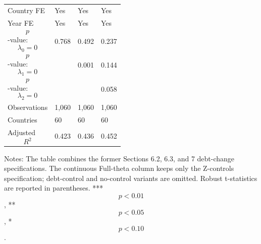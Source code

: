 \begin{table}[H]
\begin{threeparttable}
\begin{tabularx}{\textwidth}{lYYY}
Country FE & Yes & Yes & Yes \\
Year FE & Yes & Yes & Yes \\
$$p$$-value: $$\lambda_0=0$$ & 0.768 & 0.492 & 0.237 \\
$$p$$-value: $$\lambda_1=0$$ &  & 0.001 & 0.144 \\
$$p$$-value: $$\lambda_2=0$$ &  &  & 0.058 \\
Observations & 1,060 & 1,060 & 1,060 \\
Countries & 60 & 60 & 60 \\
Adjusted $$R^2$$ & 0.423 & 0.436 & 0.452 \\
\bottomrule
\end{tabularx}
\begin{tablenotes}[flushleft]\footnotesize
\item Notes: The table combines the former Sections 6.2, 6.3, and 7 debt-change specifications. The continuous Full-theta column keeps only the Z-controls specification; debt-control and no-control variants are omitted. Robust t-statistics are reported in parentheses. *** $$p<0.01$$, ** $$p<0.05$$, * $$p<0.10$$.
\end{tablenotes}
\end{threeparttable}
\end{table}
